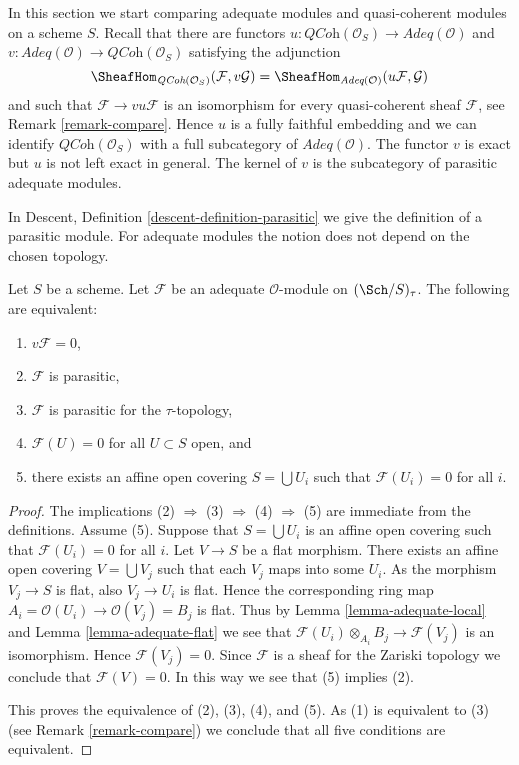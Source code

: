 \noindent
In this section we start comparing adequate modules and quasi-coherent
modules on a scheme $S$. Recall that there are functors
$u : \textit{QCoh}(\mathcal{O}_S) \to \textit{Adeq}(\mathcal{O})$
and
$v : \textit{Adeq}(\mathcal{O}) \to \textit{QCoh}(\mathcal{O}_S)$
satisfying the adjunction
$$
\SheafHom_{\textit{QCoh}(\mathcal{O}_S)}(\mathcal{F}, v\mathcal{G})
=
\SheafHom_{\textit{Adeq}(\mathcal{O})}(u\mathcal{F}, \mathcal{G})
$$
and such that $\mathcal{F} \to vu\mathcal{F}$ is an isomorphism for
every quasi-coherent sheaf $\mathcal{F}$, see
Remark \ref{remark-compare}.
Hence $u$ is a fully faithful embedding and we can identify
$\textit{QCoh}(\mathcal{O}_S)$ with a full subcategory of
$\textit{Adeq}(\mathcal{O})$.
The functor $v$ is exact but $u$ is not left exact in general.
The kernel of $v$ is the subcategory of parasitic adequate modules.

\medskip\noindent
In Descent, Definition \ref{descent-definition-parasitic}
we give the definition of a parasitic module.
For adequate modules the notion does not depend
on the chosen topology.

\begin{lemma}
\label{lemma-parasitic-adequate}
Let $S$ be a scheme.
Let $\mathcal{F}$ be an adequate $\mathcal{O}$-module on
$(\Sch/S)_\tau$. The following are equivalent:
\begin{enumerate}
\item $v\mathcal{F} = 0$,
\item $\mathcal{F}$ is parasitic,
\item $\mathcal{F}$ is parasitic for the $\tau$-topology,
\item $\mathcal{F}(U) = 0$ for all $U \subset S$ open, and
\item there exists an affine open covering $S = \bigcup U_i$
such that $\mathcal{F}(U_i) = 0$ for all $i$.
\end{enumerate}
\end{lemma}

\begin{proof}
The implications (2) $\Rightarrow$ (3) $\Rightarrow$ (4) $\Rightarrow$ (5)
are immediate from the definitions. Assume (5). Suppose that
$S = \bigcup U_i$ is an affine open covering such that $\mathcal{F}(U_i) = 0$
for all $i$. Let $V \to S$ be a flat morphism. There exists an affine
open covering $V = \bigcup V_j$ such that each $V_j$ maps into some
$U_i$. As the morphism $V_j \to S$ is flat, also $V_j \to U_i$ is flat. 
Hence the corresponding ring map
$A_i = \mathcal{O}(U_i) \to \mathcal{O}(V_j) = B_j$ is flat. Thus by
Lemma \ref{lemma-adequate-local}
and
Lemma \ref{lemma-adequate-flat}
we see that $\mathcal{F}(U_i) \otimes_{A_i} B_j \to \mathcal{F}(V_j)$
is an isomorphism. Hence $\mathcal{F}(V_j) = 0$. Since $\mathcal{F}$ is
a sheaf for the Zariski topology we conclude that $\mathcal{F}(V) = 0$.
In this way we see that (5) implies (2).

\medskip\noindent
This proves the equivalence of (2), (3), (4), and (5).
As (1) is equivalent to (3) (see
Remark \ref{remark-compare})
we conclude that all five conditions are equivalent.
\end{proof}


